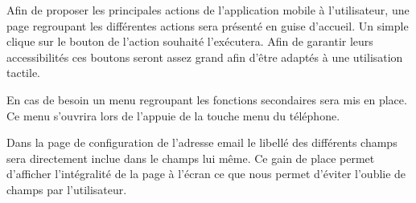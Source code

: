 \documentclass[etudiants]{support-iutrs}
\begin{document}
Afin de proposer les principales actions de l'application mobile à l’utilisateur, une page regroupant les différentes actions sera présenté en guise d'accueil.
Un simple clique sur le bouton de l'action souhaité l'exécutera. 
Afin de garantir leurs accessibilités ces boutons seront assez grand afin d'être adaptés à une utilisation tactile. 

En cas de besoin un menu regroupant les fonctions secondaires sera mis en place.
Ce menu s'ouvrira lors de l’appuie de la touche menu du téléphone. 

  \begin{figure}[h!]
  \begin{center}
    \leavevmode
    \hspace{4cm}
  \end{center}
\end{figure}

Dans la page de configuration de l'adresse email le libellé des différents champs sera directement inclue dans le champs lui même.
Ce gain de place permet d'afficher l’intégralité de la page à l'écran ce que nous permet d'éviter l'oublie de champs par l'utilisateur.
\end{document}
